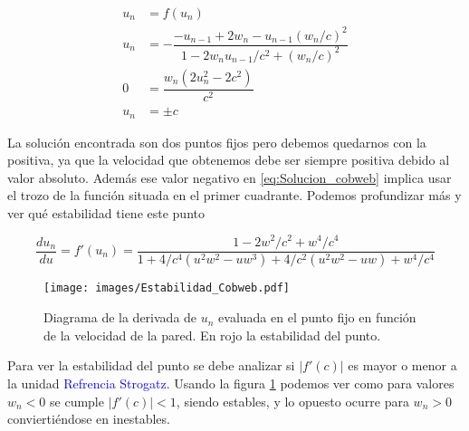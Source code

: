 \begin{align}
    u_n &= f(u_n) \nonumber\\
    u_n &= -\dfrac{-u_{n-1} + 2w_n - u_{n-1}(w_n/c)^2}{1 - 2w_n u_{n-1}/c^2 + (w_n/c)^2}\label{eq:Solucion_cobweb} \\
    0 &= \dfrac{w_n\left( 2u_n^2-2c^2 \right)}{c^2} \nonumber\\
    u_n &= \pm c \label{eq:Solucion_cobweb,valor}
\end{align}

\vspace{3mm}

La solución encontrada son dos puntos fijos pero debemos quedarnos con la positiva, ya que la velocidad que obtenemos debe ser siempre positiva debido al valor absoluto. Además ese valor negativo en \ref{eq:Solucion_cobweb} implica usar el trozo de la función situada en el primer cuadrante. Podemos profundizar más y ver qué estabilidad tiene este punto

\begin{equation}
    \dfrac{du_n}{du} = f'(u_n) = \dfrac{1 - 2w^2/c^2 + w^4/c^4}{1 + 4/c^4\left( u^2w^2-uw^3 \right) + 4/c^2\left( u^2w^2-uw \right) + w^4/c^4}
\end{equation}

\begin{figure}[H]
    \centering
    \texttt{[image: images/Estabilidad\_Cobweb.pdf]}
    \caption{Diagrama de la derivada de $u_n$ evaluada en el punto fijo en función de la velocidad de la pared. En rojo la estabilidad del punto.}
    \label{fig:estabilidad_cobweb}
\end{figure}

\vspace{3mm}

Para ver la estabilidad del punto se debe analizar si \( \left| f'(c) \right| \) es mayor o menor a la unidad \cite{Strogatz} \textcolor{blue}{Refrencia Strogatz}. Usando la figura \ref{fig:estabilidad_cobweb} podemos ver como para valores \( w_n < 0 \) se cumple \( \left| f'(c) \right| < 1 \), siendo estables, y lo opuesto ocurre para \( w_n > 0 \) conviertiéndose en inestables.

\vspace{3mm}

